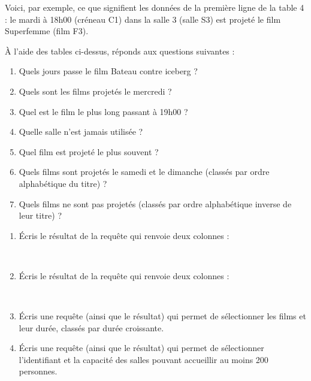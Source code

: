 \documentclass[class=report,crop=false, 12pt]{standalone}
\begin{document}
\bigskip

Voici, par exemple, ce que signifient les données de la première ligne de la table 4 :
le mardi à 18h00 (créneau C1) dans la salle 3 (salle S3) est projeté le film \og Superfemme \fg{} (film F3).


\bigskip

\begin{activite}
À l'aide des tables ci-dessus, réponds aux questions suivantes :
 \begin{enumerate}
  \item Quels jours passe le film \og Bateau contre iceberg \fg{} ?
  \item Quels sont les films projetés le mercredi ?
  \item Quel est le film le plus long passant à 19h00 ?
  \item Quelle salle n'est jamais utilisée ?
  \item Quel film est projeté le plus souvent ?
  \item Quels films sont projetés le samedi et le dimanche (classés par ordre alphabétique du titre) ?
  \item Quels films ne sont pas projetés (classés par ordre alphabétique inverse de leur titre) ?
  
\end{enumerate}

\end{activite}



\begin{activite}
\sauteligne

\begin{enumerate}
  \item  Écris le résultat de la requête qui renvoie deux colonnes :
  
  \indentation{} \\
      \indentation\indentation{}
          
          
  \item Écris le résultat de la requête qui renvoie deux colonnes :
  
  \indentation{}  \\
  \indentation\indentation{}  
    
   
  \item Écris une requête (ainsi que le résultat) qui permet de sélectionner les films et leur durée, classés par durée croissante.
  
  \item Écris une requête (ainsi que le résultat) qui permet de sélectionner l'identifiant et la capacité des salles pouvant accueillir au moins 200 personnes.
    
\end{enumerate}

\end{activite}
\end{document}
